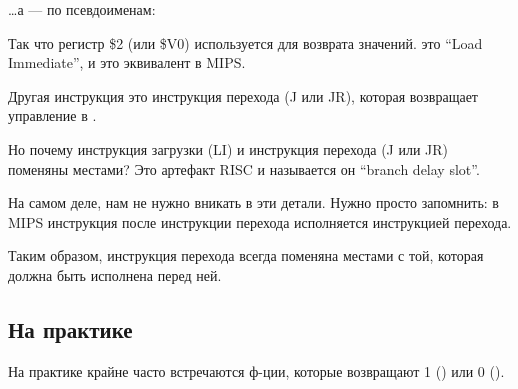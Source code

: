 

\dots а \IDA --- по псевдоименам:



Так что регистр \$2 (или \$V0) используется для возврата значений.
 это ``Load Immediate'', и это эквивалент \MOV в MIPS.

Другая инструкция это инструкция перехода (J или JR), которая возвращает управление в .

Но почему инструкция загрузки (LI) и инструкция перехода (J или JR) поменяны местами? Это артефакт \ac{RISC} и называется он ``branch delay slot''.

На самом деле, нам не нужно вникать в эти детали. Нужно просто запомнить: в MIPS инструкция после инструкции перехода исполняется  инструкцией перехода.

Таким образом, инструкция перехода всегда поменяна местами с той, которая должна быть исполнена перед ней.

\subsection{На практике}

На практике крайне часто встречаются ф-ции, которые возвращают 1 () или 0 ().

